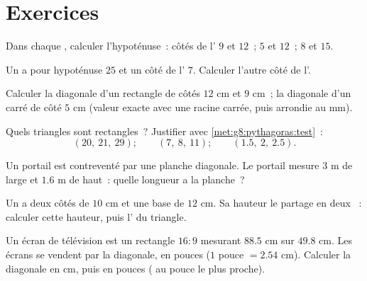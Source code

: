 \section{Exercices}

\begin{exercise}[$\star$]\label{exo:g8:pythagoras:1}
Dans chaque , calculer l'hypoténuse~:
côtés de l' $9$ et $12$~; \quad $5$ et $12$~; \quad $8$
et $15$.
\end{exercise}

\begin{exercise}[$\star$]\label{exo:g8:pythagoras:2}
Un  a pour hypoténuse $25$ et un côté de l' $7$. Calculer l'autre côté de l'.
\end{exercise}

\begin{exercise}[$\star$]\label{exo:g8:pythagoras:3}
Calculer la diagonale d'un rectangle de côtés $12$ cm et $9$ cm~; la
diagonale d'un carré de côté $5$ cm (valeur exacte avec une racine
carrée, puis arrondie au mm).
\end{exercise}

\begin{exercise}[$\star$]\label{exo:g8:pythagoras:4}
Quels triangles sont rectangles~? Justifier avec
\cref{met:g8:pythagoras:test}~:
\[
(20,\ 21,\ 29); \qquad
(7,\ 8,\ 11); \qquad
(1.5,\ 2,\ 2.5).
\]
\end{exercise}

\begin{exercise}[$\star$]\label{exo:g8:pythagoras:5}
Un portail est contreventé par une planche diagonale. Le portail
mesure $3$ m de large et $1.6$ m de haut~: quelle longueur a la
planche~?
\end{exercise}

\begin{exercise}[$\star$]\label{exo:g8:pythagoras:6}
Un  a deux côtés de $10$ cm et une base de $12$ cm.
Sa hauteur le partage en deux ~: calculer cette
hauteur, puis l' du triangle.
\end{exercise}

\begin{exercise}[$\star\star$]\label{exo:g8:pythagoras:7}
Un écran de télévision est un rectangle $16{:}9$ mesurant $88.5$ cm
sur $49.8$ cm. Les écrans se vendent par la diagonale, en pouces
($1$ pouce $= 2.54$ cm). Calculer la diagonale en cm, puis en pouces
( au pouce le plus proche).
\end{exercise}

